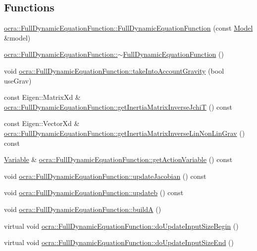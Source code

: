 \subsection*{Functions}
\begin{DoxyCompactItemize}
\item 
\hyperlink{group__constraint_ga778bffa6d85a494b3ee0c499400573a6}{ocra\+::\+Full\+Dynamic\+Equation\+Function\+::\+Full\+Dynamic\+Equation\+Function} (const \hyperlink{classocra_1_1Model}{Model} \&model)
\item 
\hyperlink{group__constraint_gab3c2d35bef3c4d8733b7ab0e9ff48bfc}{ocra\+::\+Full\+Dynamic\+Equation\+Function\+::$\sim$\+Full\+Dynamic\+Equation\+Function} ()
\item 
void \hyperlink{group__constraint_ga673fd9a47a249d84ce527011a06417aa}{ocra\+::\+Full\+Dynamic\+Equation\+Function\+::take\+Into\+Account\+Gravity} (bool use\+Grav)
\item 
const Eigen\+::\+Matrix\+Xd \& \hyperlink{group__constraint_gaf2529ade8eb0c03afaaed34a4e82e144}{ocra\+::\+Full\+Dynamic\+Equation\+Function\+::get\+Inertia\+Matrix\+Inverse\+JchiT} () const
\item 
const Eigen\+::\+Vector\+Xd \& \hyperlink{group__constraint_ga6d0c4ebdceec4ea4569266155ca41172}{ocra\+::\+Full\+Dynamic\+Equation\+Function\+::get\+Inertia\+Matrix\+Inverse\+Lin\+Non\+Lin\+Grav} () const
\item 
\hyperlink{classocra_1_1Variable}{Variable} \& \hyperlink{group__constraint_gaa3c3057ca6a00bf88c372d0c467bed67}{ocra\+::\+Full\+Dynamic\+Equation\+Function\+::get\+Action\+Variable} () const
\item 
void \hyperlink{group__constraint_ga5b4ea2e9706cd848923c835e2df0eff5}{ocra\+::\+Full\+Dynamic\+Equation\+Function\+::update\+Jacobian} () const
\item 
void \hyperlink{group__constraint_gafab74164b55cd66d2b132915774b59f0}{ocra\+::\+Full\+Dynamic\+Equation\+Function\+::updateb} () const
\item 
void \hyperlink{group__constraint_ga19d9bbe4f78b4c396930388a70b8cd4b}{ocra\+::\+Full\+Dynamic\+Equation\+Function\+::buildA} ()
\item 
virtual void \hyperlink{group__constraint_gadbdce52af8ba057e93ea923db5a3ce04}{ocra\+::\+Full\+Dynamic\+Equation\+Function\+::do\+Update\+Input\+Size\+Begin} ()
\item 
virtual void \hyperlink{group__constraint_ga8c14a0ff3f87c32d030a3a1753b7a77e}{ocra\+::\+Full\+Dynamic\+Equation\+Function\+::do\+Update\+Input\+Size\+End} ()
\end{DoxyCompactItemize}


